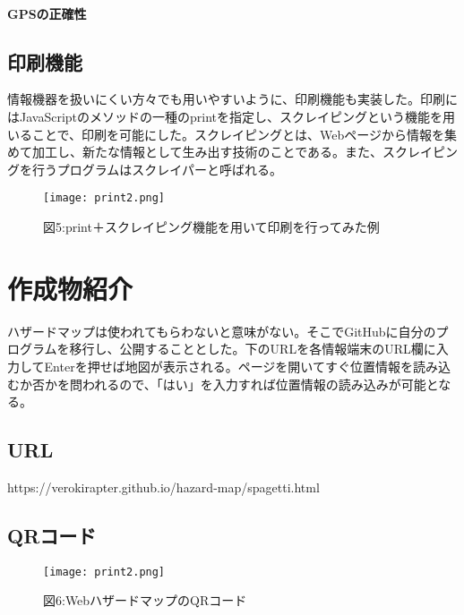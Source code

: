\documentclass[report]{jsbook}
\begin{document}
\subsubsection{GPSの正確性}
\section{印刷機能}
情報機器を扱いにくい方々でも用いやすいように、印刷機能も実装した。印刷にはJavaScriptのメソッドの一種のprintを指定し、スクレイピングという機能を用いることで、印刷を可能にした。スクレイピングとは、Webページから情報を集めて加工し、新たな情報として生み出す技術のことである。また、スクレイピングを行うプログラムはスクレイパーと呼ばれる。
\begin{center}
   \begin{figure}[htp]
    \texttt{[image: print2.png]}
    \caption{図5:print＋スクレイピング機能を用いて印刷を行ってみた例}
   \end{figure}
\end{center}

\chapter{作成物紹介}
ハザードマップは使われてもらわないと意味がない。そこでGitHubに自分のプログラムを移行し、公開することとした。下のURLを各情報端末のURL欄に入力してEnterを押せば地図が表示される。ページを開いてすぐ位置情報を読み込むか否かを問われるので、「はい」を入力すれば位置情報の読み込みが可能となる。
\section{URL}
https://verokirapter.github.io/hazard-map/spagetti.html
\section{QRコード}
\begin{center}
   \begin{figure}[htp]
    \texttt{[image: print2.png]}
    \caption{図6:WebハザードマップのQRコード}
   \end{figure}
\end{center}
\end{document}
